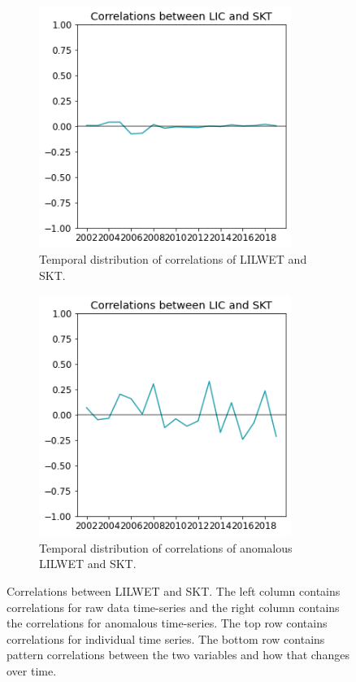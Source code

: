 \documentclass[../main.tex]{subfiles}
\begin{document}
\begin{figure}[H]
\begin{subfigure}[h!]{0.49\textwidth}
\end{subfigure}
\begin{subfigure}[h!]{0.49\textwidth}
\centering
\includegraphics[width=0.9\textwidth]{images/week8/lres/corr_lic_skt_shortterm_temporal}
\caption{Temporal distribution of correlations of LILWET and SKT.}
\end{subfigure}
\begin{subfigure}[h!]{0.49\textwidth}
\centering
\includegraphics[width=0.9\textwidth]{images/week8/lres/corr_lic_skt_shortterm_temporal_anmomalous}
\caption{Temporal distribution of correlations of anomalous LILWET and SKT.}
\end{subfigure}
\caption{Correlations between LILWET and SKT. The left column contains correlations for raw data time-series and the right column contains the correlations for anomalous time-series. The top row contains correlations for individual time series. The bottom row contains pattern correlations between the two variables and how that changes over time.}
\label{fig:correlation_between_SIC_and_SKT.}
\end{figure}
\end{document}
